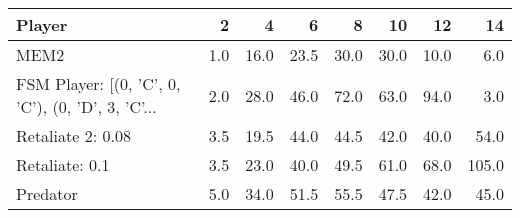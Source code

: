 \begin{tabular}{lrrrrrrr}
\toprule
                                            Player &    2 &     4 &     6 &     8 &    10 &    12 &     14 \\
\midrule
                                              MEM2 &  1.0 &  16.0 &  23.5 &  30.0 &  30.0 &  10.0 &    6.0 \\
 FSM Player: [(0, 'C', 0, 'C'), (0, 'D', 3, 'C'... &  2.0 &  28.0 &  46.0 &  72.0 &  63.0 &  94.0 &    3.0 \\
                                 Retaliate 2: 0.08 &  3.5 &  19.5 &  44.0 &  44.5 &  42.0 &  40.0 &   54.0 \\
                                    Retaliate: 0.1 &  3.5 &  23.0 &  40.0 &  49.5 &  61.0 &  68.0 &  105.0 \\
                                          Predator &  5.0 &  34.0 &  51.5 &  55.5 &  47.5 &  42.0 &   45.0 \\
\bottomrule
\end{tabular}
